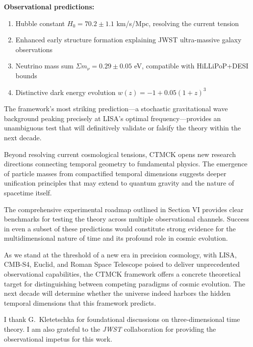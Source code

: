 \documentclass[reprint,amsmath,amssymb,aps,prd,nofootinbib,longbibliography]{revtex4-2}
\begin{document}
\textbf{Observational predictions:}
\begin{enumerate}
\item Hubble constant $H_0 = 70.2 \pm 1.1$ km/s/Mpc, resolving the current tension
\item Enhanced early structure formation explaining JWST ultra-massive galaxy observations
\item Neutrino mass sum $\Sigma m_\nu = 0.29 \pm 0.05$ eV, compatible with HiLLiPoP+DESI bounds
\item Distinctive dark energy evolution $w(z) = -1 + 0.05(1+z)^3$
\end{enumerate}

The framework's most striking prediction—a stochastic gravitational wave background peaking precisely at LISA's optimal frequency—provides an unambiguous test that will definitively validate or falsify the theory within the next decade.

Beyond resolving current cosmological tensions, CTMCK opens new research directions connecting temporal geometry to fundamental physics. The emergence of particle masses from compactified temporal dimensions suggests deeper unification principles that may extend to quantum gravity and the nature of spacetime itself.

The comprehensive experimental roadmap outlined in Section VI provides clear benchmarks for testing the theory across multiple observational channels. Success in even a subset of these predictions would constitute strong evidence for the multidimensional nature of time and its profound role in cosmic evolution.

As we stand at the threshold of a new era in precision cosmology, with LISA, CMB-S4, Euclid, and Roman Space Telescope poised to deliver unprecedented observational capabilities, the CTMCK framework offers a concrete theoretical target for distinguishing between competing paradigms of cosmic evolution. The next decade will determine whether the universe indeed harbors the hidden temporal dimensions that this framework predicts.

\begin{acknowledgments}
I thank G.~Kletetschka for foundational discussions on three‑dimensional time theory. I am also grateful to the \textit{JWST} collaboration for providing the observational impetus for this work.
\end{acknowledgments}



\end{document}
